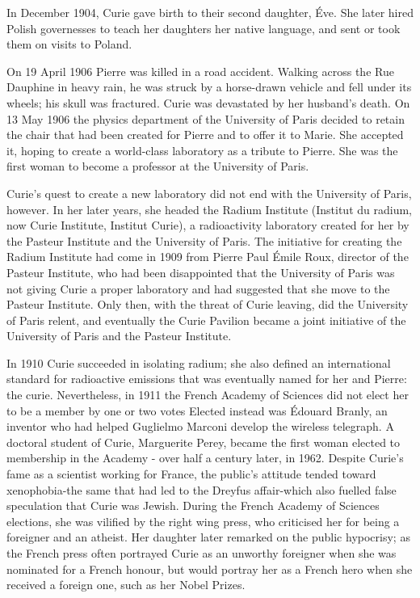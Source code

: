 \documentclass[12pt,a4paper]{article}
\begin{document}
In December 1904, Curie gave birth to their second daughter, \'Eve. She later hired Polish governesses to teach her daughters her native language, and sent or took them on visits to Poland.

On 19 April 1906 Pierre was killed in a road accident. Walking across the Rue Dauphine in heavy rain, he was struck by a horse-drawn vehicle and fell under its wheels; his skull was fractured. Curie was devastated by her husband's death. On 13 May 1906 the physics department of the University of Paris decided to retain the chair that had been created for Pierre and to offer it to Marie. She accepted it, hoping to create a world-class laboratory as a tribute to Pierre. She was the first woman to become a professor at the University of Paris.

Curie's quest to create a new laboratory did not end with the University of Paris, however. In her later years, she headed the Radium Institute (Institut du radium, now Curie Institute, Institut Curie), a radioactivity laboratory created for her by the Pasteur Institute and the University of Paris. The initiative for creating the Radium Institute had come in 1909 from Pierre Paul \'Emile Roux, director of the Pasteur Institute, who had been disappointed that the University of Paris was not giving Curie a proper laboratory and had suggested that she move to the Pasteur Institute. Only then, with the threat of Curie leaving, did the University of Paris relent, and eventually the Curie Pavilion became a joint initiative of the University of Paris and the Pasteur Institute.

In 1910 Curie succeeded in isolating radium; she also defined an international standard for radioactive emissions that was eventually named for her and Pierre: the curie. Nevertheless, in 1911 the French Academy of Sciences did not elect her to be a member by one or two votes Elected instead was \'Edouard Branly, an inventor who had helped Guglielmo Marconi develop the wireless telegraph. A doctoral student of Curie, Marguerite Perey, became the first woman elected to membership in the Academy - over half a century later, in 1962. Despite Curie's fame as a scientist working for France, the public's attitude tended toward xenophobia-the same that had led to the Dreyfus affair-which also fuelled false speculation that Curie was Jewish. During the French Academy of Sciences elections, she was vilified by the right wing press, who criticised her for being a foreigner and an atheist. Her daughter later remarked on the public hypocrisy; as the French press often portrayed Curie as an unworthy foreigner when she was nominated for a French honour, but would portray her as a French hero when she received a foreign one, such as her Nobel Prizes.
\end{document}
